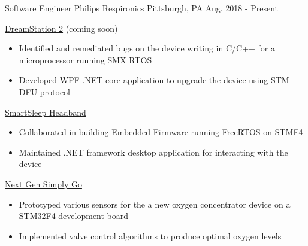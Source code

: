 


\begin{cventries}


\cventry
{Software Engineer} %
{Philips Respironics} %
{Pittsburgh, PA} %
{Aug. 2018 - Present} %
{ %
\begin{cvitems}
\item 
{
    \href{https://www.usa.philips.com/healthcare/product/HCNOCTN447/dreamstation-cpap-bi-level-therapy-systems}{\color{RoyalBlue}DreamStation 2} 
    (coming soon)
    \begin{itemize}
        \item Identified and remediated bugs on the device writing in C/C++ for a microprocessor running SMX RTOS
        \item Developed WPF .NET core application to upgrade the device using STM DFU protocol
    \end{itemize} 
}
\item 
{
    \href{https://www.usa.philips.com/c-e/smartsleep/deep-sleep-headband.html}{\color{RoyalBlue}SmartSleep Headband} 
    \begin{itemize}
        \item Collaborated in building Embedded Firmware running FreeRTOS on STMF4
        \item Maintained .NET framework desktop application for interacting with the device
    \end{itemize} 
}
\item 
{
    \href{https://www.usa.philips.com/healthcare/product/HCNOCTN350/simplygo-mini-portable-oxygen-concentrator-poc}{\color{RoyalBlue}Next Gen Simply Go} 
    \begin{itemize}
        \item Prototyped various sensors for the a new oxygen concentrator device on a STM32F4 development board 
        \item Implemented valve control algorithms to produce optimal oxygen levels 

\end{itemize}}
\end{cvitems}}
\end{cventries}
